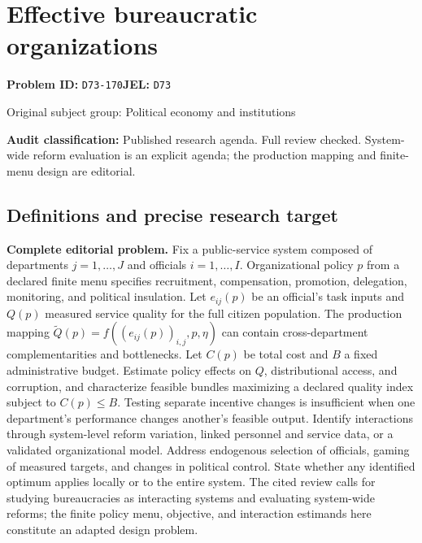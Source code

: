 \documentclass[11pt,a4paper]{article}
\begin{document}
\section*{Effective bureaucratic organizations}
\textbf{Problem ID:} \texttt{D73-170}\quad \textbf{JEL:} \texttt{D73}\par
\label{problem:OP-0382}
\label{audited:ECON-099}
\label{audited:ECON-100}
{\sffamily\small\color{muted}Original subject group: Political economy and institutions\par}
\label{definitions:problem:30007664}
\textbf{Audit classification:} Published research agenda. Full review checked. System-wide reform evaluation is an explicit agenda; the production mapping and finite-menu design are editorial.
\subsection*{Definitions and precise research target}
\textbf{Complete editorial problem.} Fix a public-service system composed of departments \(j=1,\ldots,J\) and officials \(i=1,\ldots,I\). Organizational policy \(p\) from a declared finite menu specifies recruitment, compensation, promotion, delegation, monitoring, and political insulation. Let \(e_{ij}(p)\) be an official's task inputs and \(Q(p)\) measured service quality for the full citizen population. The production mapping \(\widetilde Q(p)=f((e_{ij}(p))_{i,j},p,\eta)\) can contain cross-department complementarities and bottlenecks. Let \(C(p)\) be total cost and \(B\) a fixed administrative budget. Estimate policy effects on \(Q\), distributional access, and corruption, and characterize feasible bundles maximizing a declared quality index subject to \(C(p)\le B\). Testing separate incentive changes is insufficient when one department's performance changes another's feasible output. Identify interactions through system-level reform variation, linked personnel and service data, or a validated organizational model. Address endogenous selection of officials, gaming of measured targets, and changes in political control. State whether any identified optimum applies locally or to the entire system. The cited review calls for studying bureaucracies as interacting systems and evaluating system-wide reforms; the finite policy menu, objective, and interaction estimands here constitute an adapted design problem.
\end{document}
